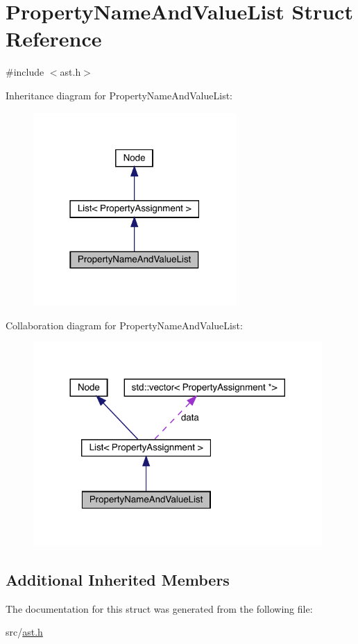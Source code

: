 \hypertarget{struct_property_name_and_value_list}{}\section{Property\+Name\+And\+Value\+List Struct Reference}
\label{struct_property_name_and_value_list}


{\ttfamily \#include $<$ast.\+h$>$}



Inheritance diagram for Property\+Name\+And\+Value\+List\+:
\nopagebreak
\begin{figure}[H]
\begin{center}
\leavevmode
\includegraphics[width=219pt]{struct_property_name_and_value_list__inherit__graph}
\end{center}
\end{figure}


Collaboration diagram for Property\+Name\+And\+Value\+List\+:
\nopagebreak
\begin{figure}[H]
\begin{center}
\leavevmode
\includegraphics[width=312pt]{struct_property_name_and_value_list__coll__graph}
\end{center}
\end{figure}
\subsection*{Additional Inherited Members}


The documentation for this struct was generated from the following file\+:\begin{DoxyCompactItemize}
\item 
src/\hyperlink{ast_8h}{ast.\+h}\end{DoxyCompactItemize}
